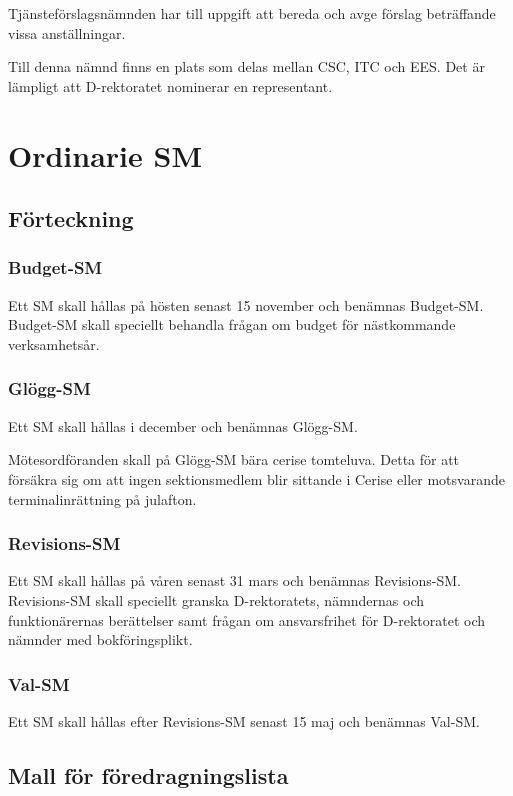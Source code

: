 \documentclass{dgovdoc}
\begin{document}
Tjänsteförslagsnämnden har till uppgift att bereda och avge förslag beträffande vissa anställningar.

Till denna nämnd finns en plats som delas mellan CSC, ITC och EES. Det är lämpligt att D-rektoratet nominerar en representant.

\section{Ordinarie SM}

\subsection{Förteckning}

\subsubsection{Budget-SM}

Ett SM skall hållas på hösten senast 15 november och benämnas Budget-SM. Budget-SM skall speciellt behandla frågan om budget för nästkommande verksamhetsår.

\subsubsection{Glögg-SM}

Ett SM skall hållas i december och benämnas Glögg-SM.

Mötesordföranden skall på Glögg-SM bära cerise tomteluva. Detta för att försäkra sig om att ingen sektionsmedlem blir sittande i Cerise eller motsvarande terminalinrättning på julafton.

\subsubsection{Revisions-SM}

Ett SM skall hållas på våren senast 31 mars och benämnas Revisions-SM. Revisions-SM skall speciellt granska D-rektoratets, nämndernas och funktionärernas berättelser samt frågan om ansvarsfrihet för D-rektoratet och nämnder med bokföringsplikt.

\subsubsection{Val-SM}

Ett SM skall hållas efter Revisions-SM senast 15 maj och benämnas Val-SM.

\subsection{Mall för föredragningslista}
\end{document}
